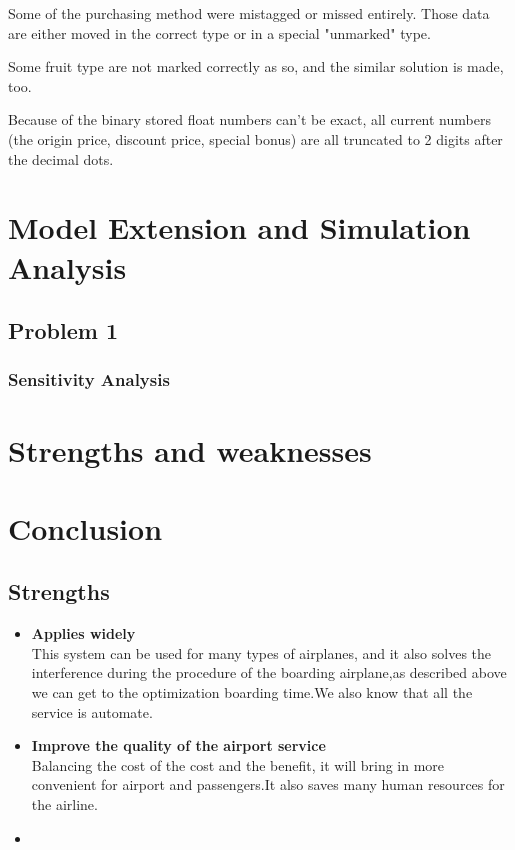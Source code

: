 \documentclass{mcmthesis}
\begin{document}
Some of the purchasing method were mistagged or missed entirely. Those data are either moved in the correct type or in a special "unmarked" type.

Some fruit type are not marked correctly as so, and the similar solution is made, too.

Because of the binary stored float numbers can't be exact, all current numbers (the origin price, discount price, special bonus) are all truncated to 2 digits after the decimal dots.
\section{Model Extension and Simulation Analysis}
\subsection{Problem 1}

\subsubsection{Sensitivity Analysis}

\section{Strengths and weaknesses}

\section{Conclusion}

\subsection{Strengths}
\begin{itemize}
\item \textbf{Applies widely}\\
This  system can be used for many types of airplanes, and it also
solves the interference during  the procedure of the boarding
airplane,as described above we can get to the  optimization
boarding time.We also know that all the service is automate.
\item \textbf{Improve the quality of the airport service}\\
Balancing the cost of the cost and the benefit, it will bring in
more convenient  for airport and passengers.It also saves many
human resources for the airline. \item \textbf{}
\end{itemize}
\end{document}
